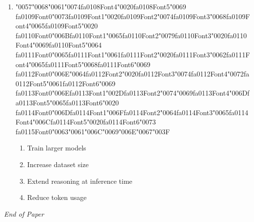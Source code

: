 \documentclass[12pt]{article}
\begin{document}
\begin{enumerate}[label=Q\arabic*.]
\item {\char"0057}{\char"0068}{\char"0061}{\char"0074}{\csname fa0108Font4\endcsname\char"0020}{\csname fa0108Font5\endcsname\char"0069} {\csname fa0109Font0\endcsname\char"0073}{\csname fa0109Font1\endcsname\char"0020}{\csname fa0109Font2\endcsname\char"0074}{\csname fa0109Font3\endcsname\char"0068}{\csname fa0109Font4\endcsname\char"0065}{\csname fa0109Font5\endcsname\char"0020} {\csname fa0110Font0\endcsname\char"006B}{\csname fa0110Font1\endcsname\char"0065}{\csname fa0110Font2\endcsname\char"0079}{\csname fa0110Font3\endcsname\char"0020}{\csname fa0110Font4\endcsname\char"0069}{\csname fa0110Font5\endcsname\char"0064} {\csname fa0111Font0\endcsname\char"0065}{\csname fa0111Font1\endcsname\char"0061}{\csname fa0111Font2\endcsname\char"0020}{\csname fa0111Font3\endcsname\char"0062}{\csname fa0111Font4\endcsname\char"0065}{\csname fa0111Font5\endcsname\char"0068}{\csname fa0111Font6\endcsname\char"0069} {\csname fa0112Font0\endcsname\char"006E}{\char"0064}{\csname fa0112Font2\endcsname\char"0020}{\csname fa0112Font3\endcsname\char"0074}{\csname fa0112Font4\endcsname\char"0072}{\csname fa0112Font5\endcsname\char"0061}{\csname fa0112Font6\endcsname\char"0069} {\csname fa0113Font0\endcsname\char"006E}{\csname fa0113Font1\endcsname\char"002D}{\csname fa0113Font2\endcsname\char"0074}{\char"0069}{\csname fa0113Font4\endcsname\char"006D}{\csname fa0113Font5\endcsname\char"0065}{\csname fa0113Font6\endcsname\char"0020} {\csname fa0114Font0\endcsname\char"006D}{\csname fa0114Font1\endcsname\char"006F}{\csname fa0114Font2\endcsname\char"0064}{\csname fa0114Font3\endcsname\char"0065}{\csname fa0114Font4\endcsname\char"006C}{\csname fa0114Font5\endcsname\char"0020}{\csname fa0114Font6\endcsname\char"0073} {\csname fa0115Font0\endcsname\char"0063}{\char"0061}{\char"006C}{\char"0069}{\char"006E}{\char"0067}{\char"003F}
\begin{enumerate}[label=(\Alph*)]
    \item Train larger models
    \item Increase dataset size
    \item Extend reasoning at inference time
    \item Reduce token usage
\end{enumerate}
\end{enumerate}

\vfill
\noindent\textit{End of Paper}
\end{document}
